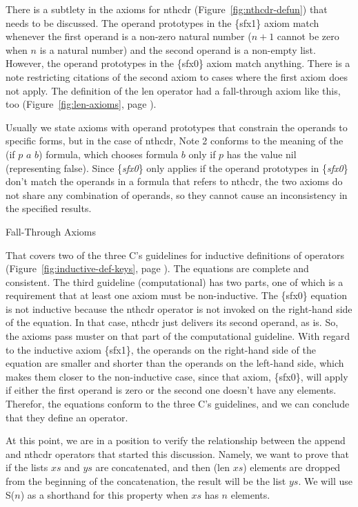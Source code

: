 \begin{aside}
There is a subtlety in the axioms for nthcdr (Figure~\ref{fig:nthcdr-defun})
that needs to be discussed.
The operand prototypes in the
\{sfx1\} axiom match whenever the first operand is a non-zero natural number
($n+1$ cannot be zero when $n$ is a natural number)
and the second operand is a non-empty list.
However, the operand prototypes in the \{sfx0\} axiom match anything.
There is a note restricting
citations of the second axiom to cases
where the first axiom does not apply.
The definition of the len operator
had a fall-through axiom like this, too
(Figure~\ref{fig:len-axioms}, page \pageref{fig:len-axioms}).

Usually we state axioms with operand prototypes that constrain
the operands to specific forms,
but in the case of nthcdr, Note 2 conforms to the meaning
of the (if $p$ $a$ $b$) formula, which chooses formula $b$
only if $p$ has the value nil (representing false).
Since \{\emph{sfx0}\} only applies if the operand prototypes in
\{\emph{sfx0}\} don't match the operands in a formula that refers to nthcdr,
the two axioms do not share any combination of operands, so they cannot
cause an inconsistency in the specified results.
\caption{Fall-Through Axioms}
\label{fig:fall-through-axioms}
\end{aside}

That covers two of the three C's guidelines for inductive definitions of operators
(Figure~\ref{fig:inductive-def-keys}, page \pageref{fig:inductive-def-keys}).
The equations are complete and consistent.
The third guideline (computational) has two parts, one of which is
a requirement that at least one axiom must be non-inductive.
The \{sfx0\} equation is not inductive because the nthcdr operator
is not invoked on the right-hand side of the equation.
In that case, nthcdr just delivers its second operand, as is.
So, the axioms pass muster on that part of the computational guideline.
With regard to the inductive axiom \{sfx1\},
the operands on the right-hand side of the equation are
smaller and shorter than the operands on the left-hand side,
which makes them closer to the non-inductive case,
since that axiom, \{sfx0\}, will apply if either the first
operand is zero or the second one doesn't have any elements.
Therefor, the equations conform to the three C's guidelines,
and we can conclude that they define an operator.

At this point, we are in a position to verify the relationship
between the append and nthcdr operators that started this discussion.
Namely, we want to prove that if the lists $xs$ and $ys$ are concatenated,
and then (len $xs$) elements are dropped from the beginning of the
concatenation, the result will be the list $ys$.
We will use S($n$) as a shorthand for this property
when $xs$ has $n$ elements.

